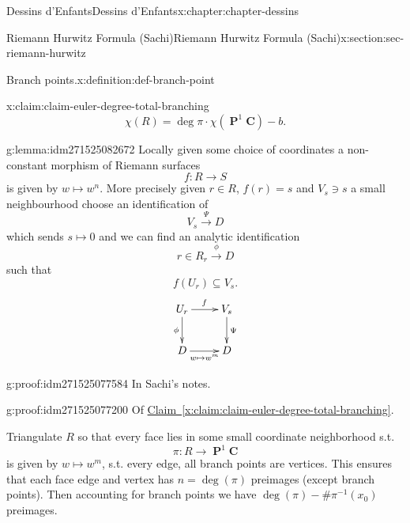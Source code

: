 \documentclass[oneside,10pt,]{book}
\numberwithin{equation}{section}
\newcommand{\inv}{^{-1}}
\newcommand{\CC}{\mathbf{C}}
\DeclareMathOperator{\PP}{\mathbf{P}}
\begin{document}
\begin{chapterptx}{Dessins d'Enfants}{}{Dessins d'Enfants}{}{}{x:chapter:chapter-dessins}
\begin{sectionptx}{Riemann Hurwitz Formula (Sachi)}{}{Riemann Hurwitz Formula (Sachi)}{}{}{x:section:sec-riemann-hurwitz}
\begin{definition}{Branch points.}{x:definition:def-branch-point}
\begin{equation*}
\end{equation*}
%
\end{definition}
\begin{claim}{}{}{x:claim:claim-euler-degree-total-branching}%
%
\begin{equation*}
\chi(R) = \deg \pi \cdot \chi(\PP^1\CC)  - b\text{.}
\end{equation*}
%
\end{claim}
\begin{lemma}{}{}{g:lemma:idm271525082672}%
Locally given some choice of coordinates a non-constant morphism of Riemann surfaces%
\begin{equation*}
f\colon R \to S
\end{equation*}
is given by \(w\mapsto w^n\). More precisely given \(r \in R\), \(f(r) = s\) and \(V_s \ni s\) a small neighbourhood choose an identification of%
\begin{equation*}
V_s \xrightarrow \Psi D
\end{equation*}
which sends \(s \mapsto 0\) and we can find an analytic identification%
\begin{equation*}
r\in R_r \xrightarrow \phi D
\end{equation*}
such that%
\begin{equation*}
f(U_r) \subseteq V_s\text{.}
\end{equation*}
%
\begin{equation*}
\xymatrix{U_r \ar[r]^f \ar[d]_\phi & V_s \ar[d]^\Psi \\ D \ar[r]_{w\mapsto w^m} & D}
\end{equation*}
%
\end{lemma}
\begin{proofptx}{}{g:proof:idm271525077584}
In Sachi's notes.%
\end{proofptx}
\begin{proofptx}{}{g:proof:idm271525077200}
Of \hyperref[x:claim:claim-euler-degree-total-branching]{Claim~\ref{x:claim:claim-euler-degree-total-branching}}.%
\par
Triangulate \(R\) so that every face lies in some small coordinate neighborhood s.t.%
\begin{equation*}
\pi \colon R\to \PP^1 \CC
\end{equation*}
is given by \(w \mapsto w^m\), s.t. every edge, all branch points are vertices. This ensures that each face edge and vertex has \(n  = \deg (\pi)\) preimages (except branch points). Then accounting for branch points we have \(\deg(\pi) -  \# \pi\inv (x_0)\) preimages.%
\end{proofptx}

\end{sectionptx}
\end{chapterptx}
\end{document}
